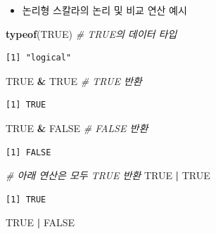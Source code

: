 \documentclass[
  11pt,
]{krantz}
\newenvironment{Shaded}{\begin{snugshade}}{\end{snugshade}}
\newcommand{\CommentTok}[1]{\textcolor[rgb]{0.37,0.37,0.37}{\textit{#1}}}
\newcommand{\KeywordTok}[1]{\textcolor[rgb]{0.27,0.27,0.27}{\textbf{#1}}}
\newcommand{\NormalTok}[1]{#1}
\newcommand{\OperatorTok}[1]{\textcolor[rgb]{0.43,0.43,0.43}{\textbf{#1}}}
\newcommand{\OtherTok}[1]{\textcolor[rgb]{0.37,0.37,0.37}{#1}}
\newcommand{\StringTok}[1]{\textcolor[rgb]{0.5,0.5,0.5}{#1}}
\providecommand{\tightlist}{%
  \setlength{\itemsep}{0pt}\setlength{\parskip}{0pt}}
\begin{document}
\normalsize

\begin{itemize}
\tightlist
\item
  논리형 스칼라의 논리 및 비교 연산 예시
\end{itemize}

\footnotesize

\begin{Shaded}
\begin{Highlighting}[]
\KeywordTok{typeof}\NormalTok{(}\OtherTok{TRUE}\NormalTok{)  }\CommentTok{# TRUE의 데이터 타입}
\end{Highlighting}
\end{Shaded}

\begin{verbatim}
[1] "logical"
\end{verbatim}

\begin{Shaded}
\begin{Highlighting}[]
\OtherTok{TRUE} \OperatorTok{&}\StringTok{ }\OtherTok{TRUE}  \CommentTok{# TRUE 반환}
\end{Highlighting}
\end{Shaded}

\begin{verbatim}
[1] TRUE
\end{verbatim}

\begin{Shaded}
\begin{Highlighting}[]
\OtherTok{TRUE} \OperatorTok{&}\StringTok{ }\OtherTok{FALSE}  \CommentTok{# FALSE 반환}
\end{Highlighting}
\end{Shaded}

\begin{verbatim}
[1] FALSE
\end{verbatim}

\begin{Shaded}
\begin{Highlighting}[]
\CommentTok{# 아래 연산은 모두 TRUE 반환}
\OtherTok{TRUE} \OperatorTok{|}\StringTok{ }\OtherTok{TRUE}
\end{Highlighting}
\end{Shaded}

\begin{verbatim}
[1] TRUE
\end{verbatim}

\begin{Shaded}
\begin{Highlighting}[]
\OtherTok{TRUE} \OperatorTok{|}\StringTok{ }\OtherTok{FALSE}
\end{Highlighting}
\end{Shaded}
\end{document}
